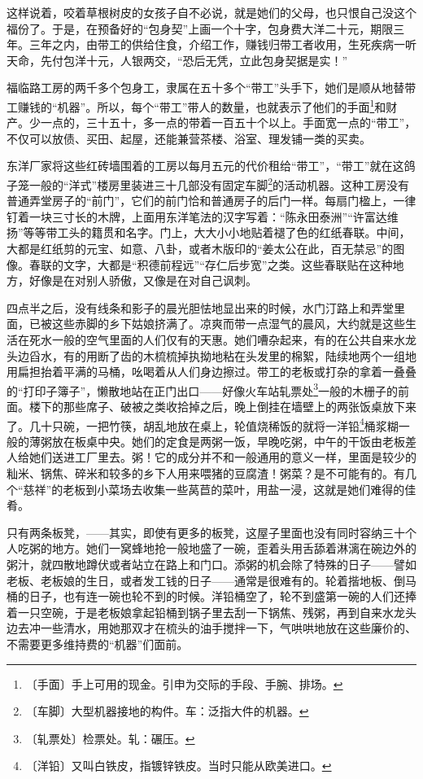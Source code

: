 \documentclass[12pt,UTF-8,openany]{ctexbook}
\begin{document}
\begin{normalsize}
    这样说着，咬着草根树皮的女孩子自不必说，就是她们的父母，也只恨自己没这个福份了。于是，在预备好的“包身契”上画一个十字，包身费大洋二十元，期限三年。三年之内，由带工的供给住食，介绍工作，赚钱归带工者收用，生死疾病一听天命，先付包洋十元，人银两交，“恐后无凭，立此包身契据是实！”
    
    福临路工房的两千多个包身工，隶属在五十多个“带工”头手下，她们是顺从地替带工赚钱的“机器”。所以，每个“带工”带人的数量，也就表示了他们的手面\footnote{〔手面〕手上可用的现金。引申为交际的手段、手腕、排场。}和财产。少一点的，三十五十，多一点的带着一百五十个以上。手面宽一点的“带工”，不仅可以放债、买田、起屋，还能兼营茶楼、浴室、理发铺一类的买卖。
    
    东洋厂家将这些红砖墙围着的工房以每月五元的代价租给“带工”，“带工”就在这鸽子笼一般的“洋式”楼房里装进三十几部没有固定车脚\footnote{〔车脚〕大型机器接地的构件。车：泛指大件的机器。}的活动机器。这种工房没有普通弄堂房子的“前门”，它们的前门恰和普通房子的后门一样。每扇门楹上，一律钉着一块三寸长的木牌，上面用东洋笔法的汉字写着：“陈永田泰洲”“许富达维扬”等等带工头的籍贯和名字。门上，大大小小地贴着褪了色的红纸春联。中间，大都是红纸剪的元宝、如意、八卦，或者木版印的“姜太公在此，百无禁忌”的图像。春联的文字，大都是“积德前程远”“存仁后步宽”之类。这些春联贴在这种地方，好像是在对别人骄傲，又像是在对自己讽刺。
    
    四点半之后，没有线条和影子的晨光胆怯地显出来的时候，水门汀路上和弄堂里面，已被这些赤脚的乡下姑娘挤满了。凉爽而带一点湿气的晨风，大约就是这些生活在死水一般的空气里面的人们仅有的天惠。她们嘈杂起来，有的在公共自来水龙头边舀水，有的用断了齿的木梳梳掉执拗地粘在头发里的棉絮，陆续地两个一组地用扁担抬着平满的马桶，吆喝着从人们身边擦过。带工的老板或打杂的拿着一叠叠的“打印子簿子”，懒散地站在正门出口——好像火车站轧票处\footnote{〔轧票处〕检票处。轧：碾压。}一般的木栅子的前面。楼下的那些席子、破被之类收拾掉之后，晚上倒挂在墙壁上的两张饭桌放下来了。几十只碗，一把竹筷，胡乱地放在桌上，轮值烧稀饭的就将一洋铅\footnote{〔洋铅〕又叫白铁皮，指镀锌铁皮。当时只能从欧美进口。}桶浆糊一般的薄粥放在板桌中央。她们的定食是两粥一饭，早晚吃粥，中午的干饭由老板差人给她们送进工厂里去。粥！它的成分并不和一般通用的意义一样，里面是较少的籼米、锅焦、碎米和较多的乡下人用来喂猪的豆腐渣！粥菜？是不可能有的。有几个“慈祥”的老板到小菜场去收集一些莴苣的菜叶，用盐一浸，这就是她们难得的佳肴。
    
    只有两条板凳，——其实，即使有更多的板凳，这屋子里面也没有同时容纳三十个人吃粥的地方。她们一窝蜂地抢一般地盛了一碗，歪着头用舌舔着淋漓在碗边外的粥汁，就四散地蹲伏或者站立在路上和门口。添粥的机会除了特殊的日子——譬如老板、老板娘的生日，或者发工钱的日子——通常是很难有的。轮着揩地板、倒马桶的日子，也有连一碗也轮不到的时候。洋铅桶空了，轮不到盛第一碗的人们还捧着一只空碗，于是老板娘拿起铅桶到锅子里去刮一下锅焦、残粥，再到自来水龙头边去冲一些清水，用她那双才在梳头的油手搅拌一下，气哄哄地放在这些廉价的、不需要更多维持费的“机器”们面前。
    

\end{normalsize}
\end{document}
